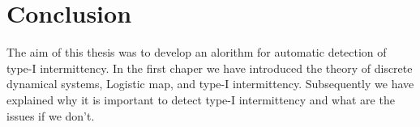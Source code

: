 \chapter{Conclusion}

The aim of this thesis was to develop an alorithm for automatic detection of type-I intermittency.
In the first chaper we have introduced the theory of discrete dynamical systems, Logistic map, and type-I intermittency.
Subsequently we have explained why it is important to detect type-I intermittency and what are the issues if we don't.

\endinput
